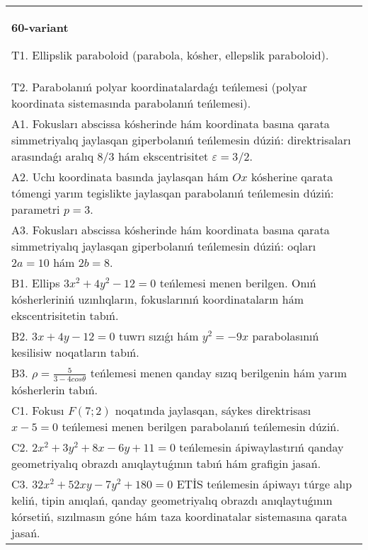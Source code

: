 \documentclass{article}
\begin{document}
\begin{tabular}{m{17cm}}
\textbf{60-variant}
\newline

T1. Ellipslik paraboloid (parabola, kósher, ellepslik paraboloid).\\

T2. Parabolanıń polyar koordinatalardaǵı teńlemesi (polyar koordinata sistemasında parabolanıń teńlemesi).\\

A1. Fokusları abscissa kósherinde hám koordinata basına qarata simmetriyalıq jaylasqan giperbolanıń teńlemesin dúziń: direktrisaları arasındaǵı aralıq $8/3$ hám ekscentrisitet $\varepsilon=3/2$.\\

A2. Uchı koordinata basında jaylasqan hám $Ox$ kósherine qarata tómengi yarım tegislikte jaylasqan parabolanıń teńlemesin dúziń: parametri $p=3$.\\

A3. Fokusları abscissa kósherinde hám koordinata basına qarata simmetriyalıq jaylasqan giperbolanıń teńlemesin dúziń: oqları $2 a=10$ hám $2 b=8$.\\

B1. Ellips $3x^{2} + 4y^{2} - 12 = 0$ teńlemesi menen berilgen. Onıń kósherleriniń uzınlıqların, fokuslarınıń koordinataların hám ekscentrisitetin tabıń.  \\

B2. $3x + 4y - 12 = 0$ tuwrı sızıǵı hám $y^{2} = - 9x$ parabolasınıń kesilisiw noqatların tabıń.  \\

B3. $\rho = \frac{5}{3 - 4cos\theta}$ teńlemesi menen qanday sızıq berilgenin hám yarım kósherlerin tabıń.  \\

C1. Fokusı $F(7;2)$ noqatında jaylasqan, sáykes direktrisası $x - 5 = 0$ teńlemesi menen berilgen parabolanıń teńlemesin dúziń.  \\

C2. $2x^{2} + 3y^{2} + 8x - 6y + 11 = 0$ teńlemesin ápiwaylastırıń qanday geometriyalıq obrazdı anıqlaytuǵının tabıń hám grafigin jasań.\\

C3. $32x^{2} + 52xy - 7y^{2} + 180 = 0$ ETİS teńlemesin ápiwayı túrge alıp keliń, tipin anıqlań, qanday geometriyalıq obrazdı anıqlaytuǵının kórsetiń, sızılmasın góne hám taza koordinatalar sistemasına qarata jasań.  \\

\end{tabular}
\vspace{1cm}
\end{document}
